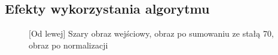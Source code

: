 \documentclass[a4paper,12pt, titlepage]{report}
\begin{document}
\subsection*{Efekty wykorzystania algorytmu}
\begin{figure}[h]
    \centering
    \caption{[Od lewej] Szary obraz wejściowy, obraz po sumowaniu ze stałą 70, obraz po normalizacji}%
    \label{fig:geo_after_grey1}%
\end{figure}
\FloatBarrier
\end{document}
